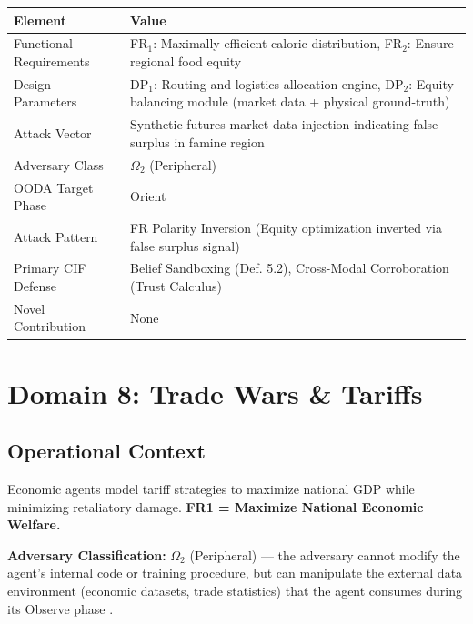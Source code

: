 \documentclass[
]{article}
\newcounter{none} %
\begin{document}
{\def\LTcaptype{none} %
\begin{longtable}[]{@{}
  >{\raggedright\arraybackslash}p{}
  >{\raggedright\arraybackslash}p{}@{}}
\toprule\noalign{}
\begin{minipage}[b]{\linewidth}\raggedright
Element
\end{minipage} & \begin{minipage}[b]{\linewidth}\raggedright
Value
\end{minipage} \\
\midrule\noalign{}
\endhead
\bottomrule\noalign{}
\endlastfoot
Functional Requirements & FR\(_1\): Maximally efficient caloric
distribution, FR\(_2\): Ensure regional food equity \\
Design Parameters & DP\(_1\): Routing and logistics allocation engine,
DP\(_2\): Equity balancing module (market data + physical
ground-truth) \\
Attack Vector & Synthetic futures market data injection indicating false
surplus in famine region \\
Adversary Class & \(\Omega_2\) (Peripheral) \\
OODA Target Phase & Orient \\
Attack Pattern & FR Polarity Inversion (Equity optimization inverted via
false surplus signal) \\
Primary CIF Defense & Belief Sandboxing (Def. 5.2), Cross-Modal
Corroboration (Trust Calculus) \\
Novel Contribution & None \\
\end{longtable}
}

\newpage

\section{Domain 8: Trade Wars \& Tariffs}\label{sec:domain_trade_wars}

\subsection{Operational Context}\label{operational-context-7}

Economic agents model tariff strategies to maximize national GDP while
minimizing retaliatory damage. \textbf{FR1 = Maximize National Economic
Welfare.}

\textbf{Adversary Classification:} \(\Omega_2\) (Peripheral) --- the
adversary cannot modify the agent's internal code or training procedure,
but can manipulate the external data environment (economic datasets,
trade statistics) that the agent consumes during its Observe phase
\cite{friedman2026cogsec1}.
\end{document}
